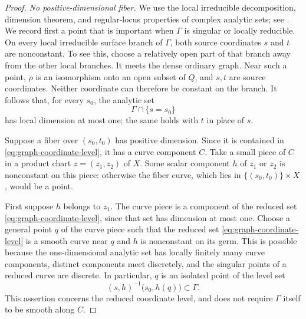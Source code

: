 \begin{proof}
\emph{No positive-dimensional fiber.}
We use the local irreducible decomposition, dimension theorem, and
regular-locus properties of complex analytic sets; see
\cite[Chapter~II, Section~4]{DemaillyCADG}.
We record first a point that is important when $\Gamma$ is singular or
locally reducible.  On every local irreducible surface branch of $\Gamma$,
both source coordinates $s$ and $t$ are nonconstant.  To see this, choose
a relatively open part of that branch away from the other local branches.
It meets the dense ordinary graph.  Near such a point, $\rho$ is an
isomorphism onto an open subset of $Q$, and $s,t$ are source coordinates.
Neither coordinate can therefore be constant on the branch.  It follows
that, for every $s_0$, the analytic set
\begin{equation}\label{eq:graph-coordinate-level}
 \Gamma\cap\{s=s_0\}
\end{equation}
has local dimension at most one; the same holds with $t$ in place of $s$.

Suppose a fiber over $(s_0,t_0)$ has positive dimension.  Since it is
contained in \eqref{eq:graph-coordinate-level}, it has a curve component
$C$.  Take a small piece of $C$ in a product chart
$z=(z_1,z_2)$ of $X$.  Some scalar component $h$ of $z_1$ or $z_2$ is
nonconstant on this piece: otherwise the fiber curve, which lies in
$\{(s_0,t_0)\}\times X$, would be a point.

First suppose $h$ belongs to $z_1$.  The curve piece is a component of
the reduced set \eqref{eq:graph-coordinate-level}, since that set has
dimension at most one.  Choose a general point $q$ of the
curve piece such that the reduced set \eqref{eq:graph-coordinate-level}
is a smooth curve near $q$ and $h$ is nonconstant on its germ.  This is
possible because the one-dimensional analytic set has locally finitely
many curve components, distinct components meet discretely, and the
singular points of a reduced curve are discrete.  In particular, $q$ is
an isolated point of the level set
\[
 (s,h)^{-1}\bigl(s_0,h(q)\bigr)\subset\Gamma.
\]
This assertion concerns the reduced coordinate level, and does not
require $\Gamma$ itself to be smooth along $C$.


\end{proof}
